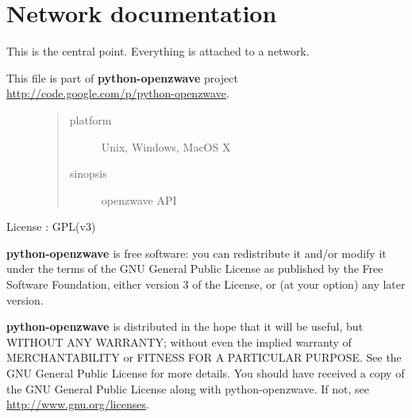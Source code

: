 \documentclass[letterpaper,10pt,english]{sphinxmanual}
\begin{document}
\section{Network documentation}
\label{network:network-documentation}\label{network::doc}
This is the central point. Everything is attached to a network.
\label{network:module-openzwave.network}\label{network:module-openzwave.network}\begin{description}
\item[{This file is part of \textbf{python-openzwave} project \href{http://code.google.com/p/python-openzwave}{http://code.google.com/p/python-openzwave}.}] \leavevmode\begin{quote}\begin{description}
\item[{platform}] \leavevmode
Unix, Windows, MacOS X

\item[{sinopsis}] \leavevmode
openzwave API

\end{description}\end{quote}

\end{description}

License : GPL(v3)

\textbf{python-openzwave} is free software: you can redistribute it and/or modify
it under the terms of the GNU General Public License as published by
the Free Software Foundation, either version 3 of the License, or
(at your option) any later version.

\textbf{python-openzwave} is distributed in the hope that it will be useful,
but WITHOUT ANY WARRANTY; without even the implied warranty of
MERCHANTABILITY or FITNESS FOR A PARTICULAR PURPOSE. See the
GNU General Public License for more details.
You should have received a copy of the GNU General Public License
along with python-openzwave. If not, see \href{http://www.gnu.org/licenses}{http://www.gnu.org/licenses}.
\end{document}
